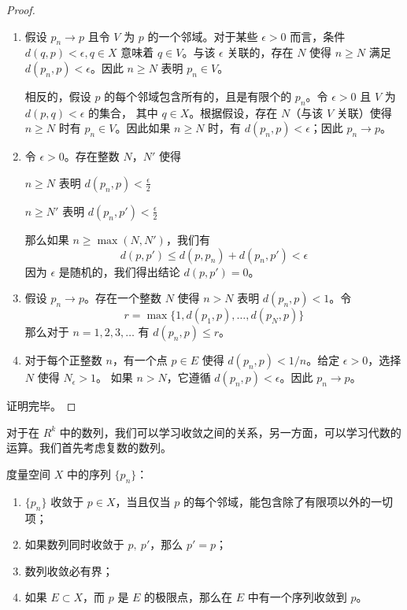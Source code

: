 \documentclass[../poma-notes.tex]{subfiles}
\begin{document}
\begin{proof}
  \begin{enumerate}[label=(\alph*)]
    \item 假设 $p_n \to p$ 且令 $V$ 为 $p$ 的一个邻域。对于某些 $\epsilon > 0$ 而言，条件 $d(q,p)<\epsilon,q\in X$ 意味着
          $q \in V$。与该 $\epsilon$ 关联的，存在 $N$ 使得 $n \ge N$ 满足 $d(p_n,p) < \epsilon$。因此 $n \ge N$ 表明
          $p_n \in V$。

          相反的，假设 $p$ 的每个邻域包含所有的，且是有限个的 $p_n$。令 $\epsilon > 0$ 且 $V$ 为 $d(p,q)<\epsilon$ 的集合，
          其中 $q \in X$。根据假设，存在 $N$（与该 $V$ 关联）使得 $n \ge N$ 时有 $p_n \in V$。因此如果 $n \ge N$ 时，有
          $d(p_n,p) < \epsilon$；因此 $p_n \to p$。
    \item 令 $\epsilon > 0$。存在整数 $N$，$N'$ 使得
          \begin{center}
            $n \ge N $ 表明 $d(p_n,p)<\frac{\epsilon}{2}$
          \end{center}
          \begin{center}
            $n \ge N' $ 表明 $d(p_n,p')<\frac{\epsilon}{2}$
          \end{center}
          那么如果 $n \ge \max(N, N')$，我们有
          \[d(p,p') \le d(p,p_n) + d(p_n,p') < \epsilon\]
          因为 $\epsilon$ 是随机的，我们得出结论 $d(p,p') = 0$。
    \item 假设 $p_n \to p$。存在一个整数 $N$ 使得 $n > N$ 表明 $d(p_n,p) < 1$。令
          \[r = \max \{1, d(p_1,p), \dots, d(p_N,p)\}\]
          那么对于 $n=1,2,3,\dots$ 有 $d(p_n, p) \le r$。
    \item 对于每个正整数 $n$，有一个点 $p \in E$ 使得 $d(p_n,p)<1/n$。给定 $\epsilon>0$，选择 $N$ 使得 $N_{\epsilon}>1$。
          如果 $n > N$，它遵循 $d(p_n,p) < \epsilon$。因此 $p_n \to p$。
  \end{enumerate}
  证明完毕。
\end{proof}

对于在 $R^k$ 中的数列，我们可以学习收敛之间的关系，另一方面，可以学习代数的运算。我们首先考虑复数的数列。

\begin{anote}
  度量空间 $X$ 中的序列 $\{p_n\}$：
  \begin{enumerate}[label=(\alph*)]
    \item $\{p_n\}$ 收敛于 $p \in X$，当且仅当 $p$ 的每个邻域，能包含除了有限项以外的一切项；
    \item 如果数列同时收敛于 $p,\ p'$，那么 $p' = p$；
    \item 数列收敛必有界；
    \item 如果 $E \subset X$，而 $p$ 是 $E$ 的极限点，那么在 $E$ 中有一个序列收敛到 $p$。
  \end{enumerate}
\end{anote}
\end{document}
